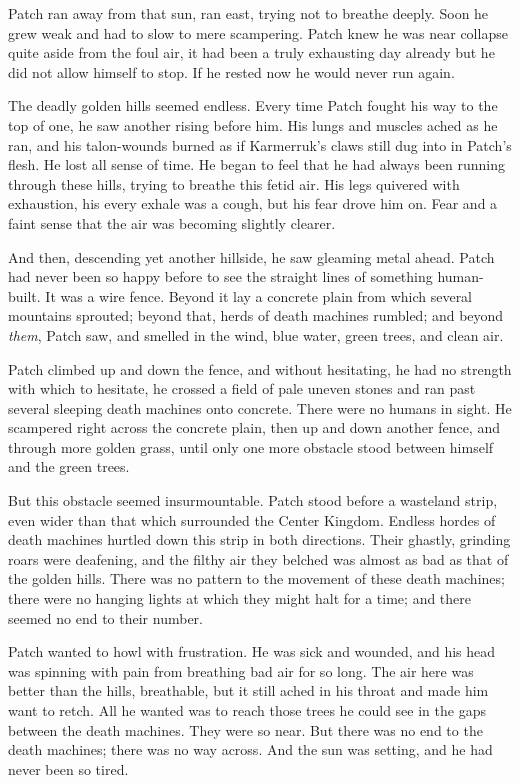 \documentclass[12pt]{book}
\begin{document}
Patch ran away from that sun, ran east, trying not to breathe deeply. Soon he grew weak and had to slow to mere scampering. Patch knew he was near collapse %
quite aside from the foul air, it had been a truly exhausting day already %
but he did not allow himself to stop. If he rested now he would never run again.

The deadly golden hills seemed endless. Every time Patch fought his way to the top of one, he saw another rising before him. His lungs and muscles ached as he ran, and his talon-wounds burned as if Karmerruk's claws still dug into in Patch's flesh. He lost all sense of time. He began to feel that he had always been running through these hills, trying to breathe this fetid air. His legs quivered with exhaustion, his every exhale was a cough, but his fear drove him on. Fear %
and a faint sense that the air was becoming slightly clearer.

And then, descending yet another hillside, he saw gleaming metal ahead. Patch had never been so happy before to see the straight lines of something human-built. It was a wire fence. Beyond it lay a concrete plain from which several mountains sprouted; beyond that, herds of death machines rumbled; and beyond {\it them}, Patch saw, and smelled in the wind, blue water, green trees, and clean air.

Patch climbed up and down the fence, and without hesitating, he had no strength with which to hesitate, he crossed a field of pale uneven stones and ran past several sleeping death machines onto concrete. There were no humans in sight. He scampered right across the concrete plain, then up and down another fence, and through more golden grass, until only one more obstacle stood between himself and the green trees.

But this obstacle seemed insurmountable. Patch stood before a wasteland strip, even wider than that which surrounded the Center Kingdom. Endless hordes of death machines hurtled down this strip in both directions. Their ghastly, grinding roars were deafening, and the filthy air they belched was almost as bad as that of the golden hills. There was no pattern to the movement of these death machines; there were no hanging lights at which they might halt for a time; and there seemed no end to their number.

Patch wanted to howl with frustration. He was sick and wounded, and his head was spinning with pain from breathing bad air for so long. The air here was better than the hills, breathable, but it still ached in his throat and made him want to retch. All he wanted was to reach those trees he could see in the gaps between the death machines. They were so near. But there was no end to the death machines; there was no way across. And the sun was setting, and he had never been so tired.
\end{document}
